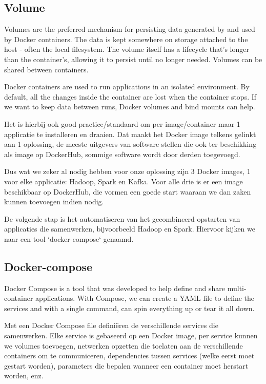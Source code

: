 \subsection{Volume}
Volumes are the preferred mechanism for persisting data generated by and used by Docker containers.
The data is kept somewhere on storage attached to the host - often the local filesystem. The volume itself has a lifecycle that's longer than the container's, allowing it to persist until no longer needed. Volumes can be shared between containers. \autocite{Javatpoint2023}

Docker containers are used to run applications in an isolated environment. By default, all the changes inside the container are lost when the container stops. If we want to keep data between runs, Docker volumes and bind mounts can help. \autocite{Frieze2022}

Het is hierbij ook good practice/standaard om per image/container maar 1 applicatie te installeren en draaien. Dat maakt het Docker image telkens gelinkt aan 1 oplossing, de meeste uitgevers van software stellen die ook ter beschikking als image op DockerHub, sommige software wordt door derden toegevoegd.

Dus wat we zeker al nodig hebben voor onze oplossing zijn 3 Docker images, 1 voor elke applicatie: Hadoop, Spark en Kafka. Voor alle drie is er een image beschikbaar op DockerHub, die vormen een goede start waaraan we dan zaken kunnen toevoegen indien nodig.

De volgende stap is het automatiseren van het gecombineerd opstarten van applicaties die samenwerken, bijvoorbeeld Hadoop en Spark. Hiervoor kijken we naar een tool `docker-compose` genaamd.

\subsection{Docker-compose}
Docker Compose is a tool that was developed to help define and share multi-container applications. With Compose, we can create a YAML file to define the services and with a single command, can spin everything up or tear it all down. \autocite{Docker2023}

Met een Docker Compose file definiëren de verschillende services die samenwerken. Elke service is gebaseerd op een Docker image, per service kunnen we volumes toevoegen, netwerken opzetten die toelaten aan de verschillende containers om te communiceren, dependencies tussen services (welke eerst moet gestart worden), parameters die bepalen wanneer een container moet herstart worden, enz. 

